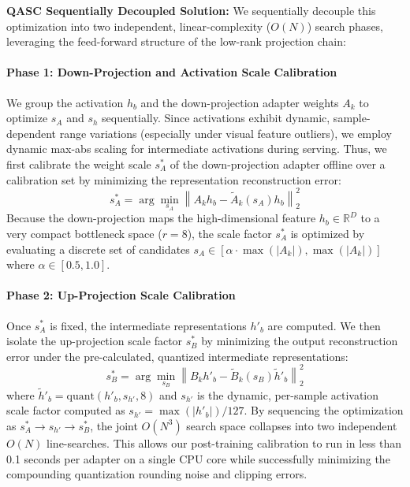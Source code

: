 \textbf{QASC Sequentially Decoupled Solution:} We sequentially decouple this optimization into two independent, linear-complexity ($O(N)$) search phases, leveraging the feed-forward structure of the low-rank projection chain:

\paragraph{Phase 1: Down-Projection and Activation Scale Calibration}
We group the activation $h_b$ and the down-projection adapter weights $A_k$ to optimize $s_A$ and $s_h$ sequentially. Since activations exhibit dynamic, sample-dependent range variations (especially under visual feature outliers), we employ dynamic max-abs scaling for intermediate activations during serving. Thus, we first calibrate the weight scale $s_A^*$ of the down-projection adapter offline over a calibration set by minimizing the representation reconstruction error:
\begin{equation}
    s_A^* = \arg\min_{s_A} \left\| A_k h_b - \tilde{A}_k(s_A) h_b \right\|_2^2
\end{equation}
Because the down-projection maps the high-dimensional feature $h_b \in \mathbb{R}^D$ to a very compact bottleneck space ($r=8$), the scale factor $s_A^*$ is optimized by evaluating a discrete set of candidates $s_A \in [\alpha \cdot \max(|A_k|), \max(|A_k|)]$ where $\alpha \in [0.5, 1.0]$. 

\paragraph{Phase 2: Up-Projection Scale Calibration}
Once $s_A^*$ is fixed, the intermediate representations $h'_b$ are computed. We then isolate the up-projection scale factor $s_B^*$ by minimizing the output reconstruction error under the pre-calculated, quantized intermediate representations:
\begin{equation}
    s_B^* = \arg\min_{s_B} \left\| B_k h'_b - \tilde{B}_k(s_B) \tilde{h}'_b \right\|_2^2
\end{equation}
where $\tilde{h}'_b = \text{quant}(h'_b, s_{h'}, 8)$ and $s_{h'}$ is the dynamic, per-sample activation scale factor computed as $s_{h'} = \max(|h'_b|) / 127$. By sequencing the optimization as $s_A^* \rightarrow s_{h'} \rightarrow s_B^*$, the joint $O(N^3)$ search space collapses into two independent $O(N)$ line-searches. This allows our post-training calibration to run in less than 0.1 seconds per adapter on a single CPU core while successfully minimizing the compounding quantization rounding noise and clipping errors.

